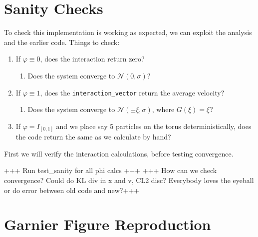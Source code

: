 \documentclass[11pt,a4paper,dvipsnames]{article}
\renewcommand{\phi}{\varphi}
\begin{document}
    \section{Sanity Checks}
        To check this implementation is working as expected, we can exploit the analysis and the earlier code. Things to check:
        \begin{enumerate}
            \item If $\phi\equiv 0$, does the interaction return zero?
            \begin{enumerate}
                 \item  Does the system converge to $\mathcal{N}(0,\sigma)$?
            \end{enumerate}
            \item If $\phi \equiv 1$, does the \texttt{interaction\_vector} return the average velocity?
            \begin{enumerate}
                 \item  Does the system converge to $\mathcal{N}(\pm \xi,\sigma)$, where $G(\xi)=\xi$? 
            \end{enumerate}
            \item If $\phi = I_{[0,1]}$ and we place say 5 particles on the torus deterministically, does the code return the same as we calculate by hand?
        \end{enumerate}
        First we will verify the interaction calculations, before testing convergence.
        
        +++ Run test\_sanity for all phi calcs +++
        +++ How can we check convergence? Could do KL div in x and v, CL2 disc? Everybody loves the eyeball or do error between old code and new?+++
        
    
            
    \section{Garnier Figure Reproduction}
\end{document}
